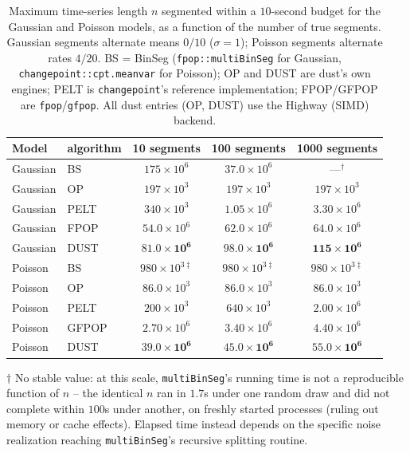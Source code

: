 \documentclass{article}
\begin{document}
\begin{table}[!ht]
\caption{Maximum time-series length $n$ segmented within a $10$-second budget for the Gaussian and Poisson models, as a function of the number of true segments. Gaussian segments alternate means $0/10$ ($\sigma=1$); Poisson segments alternate rates $4/20$. BS = BinSeg (\texttt{fpop::multiBinSeg} for Gaussian, \texttt{changepoint::cpt.meanvar} for Poisson); OP and DUST are dust's own engines; PELT is \texttt{changepoint}'s reference implementation; FPOP/GFPOP are \texttt{fpop}/\texttt{gfpop}. All dust entries (OP, DUST) use the Highway (SIMD) backend. \label{tab:simulation_results}}
\begin{tabular*}{\columnwidth}{@{\extracolsep\fill}llccc@{\extracolsep\fill}}
\toprule
Model & algorithm & 10 segments & 100 segments & 1000 segments \\
\midrule
Gaussian & BS    & $175 \times 10^6$          & $37.0 \times 10^6$         & $\text{---}^\dagger$ \\
Gaussian & OP    & $197 \times 10^3$          & $197 \times 10^3$          & $197 \times 10^3$ \\
Gaussian & PELT  & $340 \times 10^3$          & $1.05 \times 10^6$         & $3.30 \times 10^6$ \\
Gaussian & FPOP  & $54.0 \times 10^6$         & $62.0 \times 10^6$         & $64.0 \times 10^6$ \\
Gaussian & DUST  & $\mathbf{81.0 \times 10^6}$ & $\mathbf{98.0 \times 10^6}$ & $\mathbf{115 \times 10^6}$ \\
\midrule
Poisson & BS    & $980 \times 10^{3\ddagger}$ & $980 \times 10^{3\ddagger}$ & $980 \times 10^{3\ddagger}$ \\
Poisson & OP    & $86.0 \times 10^3$         & $86.0 \times 10^3$         & $86.0 \times 10^3$ \\
Poisson & PELT  & $200 \times 10^3$          & $640 \times 10^3$          & $2.00 \times 10^6$ \\
Poisson & GFPOP & $2.70 \times 10^6$         & $3.40 \times 10^6$         & $4.40 \times 10^6$ \\
Poisson & DUST  & $\mathbf{39.0 \times 10^6}$ & $\mathbf{45.0 \times 10^6}$ & $\mathbf{55.0 \times 10^6}$ \\
\bottomrule
\end{tabular*}

\vspace{0.5em}
\footnotesize
$\dagger$ No stable value: at this scale, \texttt{multiBinSeg}'s running time is not a reproducible function of $n$ -- the identical $n$ ran in $1.7$s under one random draw and did not complete within $100$s under another, on freshly started processes (ruling out memory or cache effects). Elapsed time instead depends on the specific noise realization reaching \texttt{multiBinSeg}'s recursive splitting routine.


\end{table}
\end{document}

